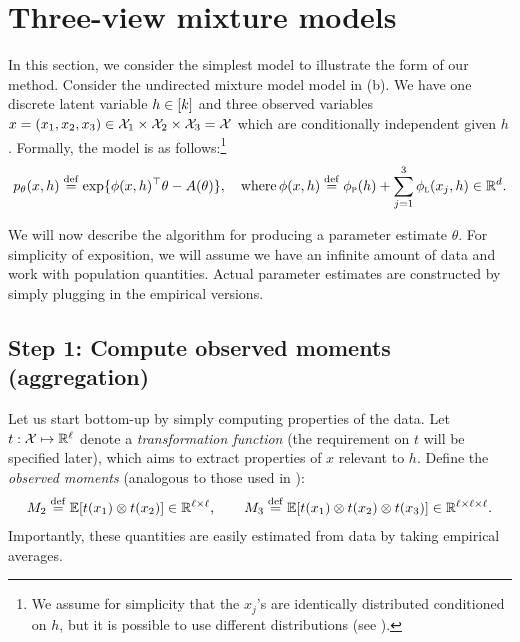 \section{Three-view mixture models}
\label{sec:threeViewMixtureModel}


In this section, we consider the simplest model to illustrate the form of our
method.  Consider the undirected mixture model model in (b).
We have one discrete latent variable $h \in [k]$ and
three observed variables
$x = (x_1, x_2, x_3) \in \mathcal{X}_1 \times \mathcal{X}_2 \times \mathcal{X}_3 = \mathcal{X}$
which are conditionally independent given $h$.
Formally, the model is as follows:\footnote{We assume for simplicity that the $x_j$'s are identically distributed conditioned on $h$,
but it is possible to use different distributions (see \citet{anandkumar12moments}).}
\begin{align}
  \label{eqn:mixtureModel}
  p_\theta(x, h) \stackrel{\rm def}{=} \exp \{ \phi(x, h)^\top\theta - A(\theta) \}, \quad\text{where} \, \phi(x, h) \stackrel{\rm def}{=} \phi_\text{\sc p}(h) + \sum_{j=1}^3 \phi_\text{\sc l}(x_j, h) \in \mathbb{R}^d.
\end{align}

We will now describe the algorithm for producing a parameter
estimate $\hat\theta$.  For simplicity of exposition, we will assume we have an infinite
amount of data and work with population quantities.  Actual parameter
estimates are constructed by simply plugging in the empirical versions.

\subsection{Step 1: Compute observed moments (aggregation)}

Let us start bottom-up by simply computing properties of the data.
Let $t : \mathcal{X} \mapsto \mathbb{R}^\ell$ denote a \emph{transformation function}
(the requirement on $t$ will be specified later),
which aims to extract properties of $x$ relevant to $h$.
Define the \emph{observed moments} (analogous to those used in \cite{anandkumar12moments}):
\begin{align}
  M_2 \stackrel{\rm def}{=} \mathbb{E}[t(x_1) \otimes t(x_2)] \in \mathbb{R}^{\ell \times \ell}, \quad\quad
  M_3 \stackrel{\rm def}{=} \mathbb{E}[t(x_1) \otimes t(x_2) \otimes t(x_3)] \in \mathbb{R}^{\ell \times \ell \times \ell}.
\end{align}
Importantly, these quantities are easily estimated from data by taking empirical averages.

